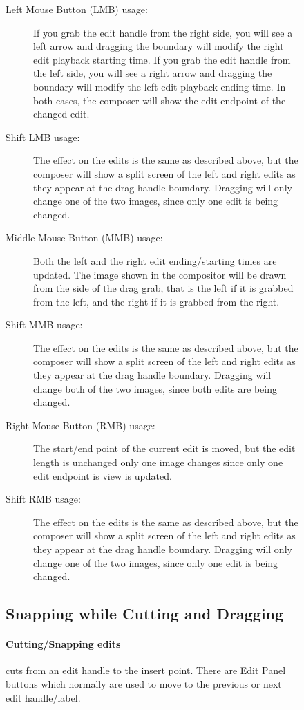 \begin{figure}
\begin{description}
    \item[Left Mouse Button (LMB) usage:] If you grab the edit handle from the right side, you will see a left arrow and dragging the boundary will modify the right edit playback starting time. If you grab the edit handle from the left side, you will see a right arrow and dragging the boundary will modify the left edit playback ending time. In both cases, the composer will show the edit endpoint of the changed edit.
    \item[Shift LMB usage:] The effect on the edits is the same as described above, but the composer will show a split screen of
    the left and right edits as they appear at the drag handle boundary. Dragging will only change one of the two images, since only one edit is being changed.
    \item[Middle Mouse Button (MMB) usage:] Both the left and the right edit ending/starting times are updated.  The image shown in the compositor will be drawn from the side of the drag grab, that is the left if it is grabbed from the left, and the right if it is grabbed from the right.
    \item[Shift MMB usage:] The effect on the edits is the same as described above, but the composer will show a split screen of
    the left and right edits as they appear at the drag handle boundary.  Dragging will change both of the two images, since both edits are being changed.
    \item[Right Mouse Button (RMB) usage:] The start/end point of the current edit is moved, but the edit length is unchanged only one image changes since only one edit endpoint is view is updated.
    \item[Shift RMB usage:] The effect on the edits is the same as described above, but the composer will show a split screen of
    the left and right edits as they appear at the drag handle boundary.  Dragging will only change one of the two images, since only one edit is being changed.
\end{description}

\subsection{Snapping while Cutting and Dragging}%
\label{sub:snapping_cutting_dragging}

\paragraph{Cutting/Snapping edits} cuts from an edit handle to the insert point. 
There are Edit Panel buttons which normally are used to move to the previous or next edit handle/label.


\end{figure}

